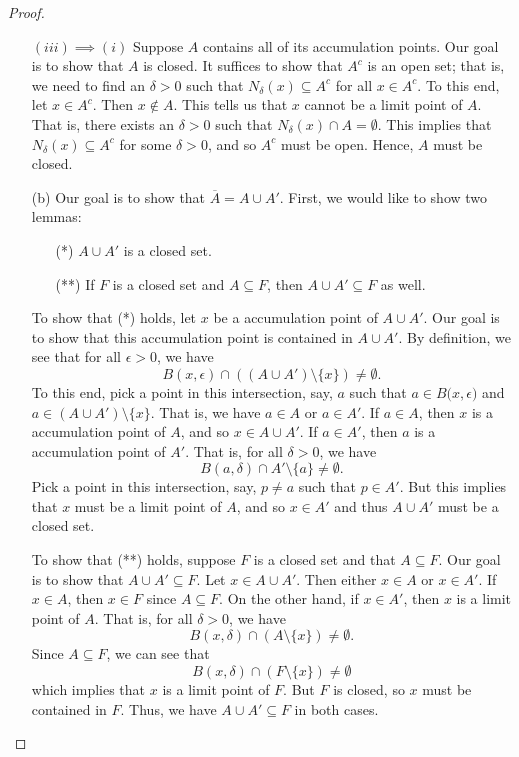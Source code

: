 \documentclass[a4paper]{article}
\begin{document}
\begin{proof}
\begin{enumerate}
        \( (iii) \implies (i) \) Suppose \( A  \) contains all of its accumulation points. Our goal is to show that \( A  \) is closed. It suffices to show that \( A^{c} \) is an open set; that is, we need to find an \( \delta > 0  \) such that \( {N}_{\delta}(x) \subseteq A^{c} \) for all \( x \in A^{c} \). To this end, let \( x \in A^{c} \). Then \( x \notin A  \). This tells us that \( x  \) cannot be a limit point of \( A  \). That is, there exists an \( \delta > 0  \) such that \( {N}_{\delta}(x) \cap A = \emptyset \). This implies that \( {N}_{\delta}(x) \subseteq A^{c} \) for some \( \delta > 0  \), and so \( A^{c} \) must be open. Hence, \( A  \) must be closed.
    \item[(b)] Our goal is to show that \( \overline{A} = A \cup A' \). First, we would like to show two lemmas:   
        \begin{enumerate}
            \item[(*)] \( A \cup A' \) is a closed set.
            \item[(**)] If \( F  \) is a closed set and \( A \subseteq F \), then \( A \cup A' \subseteq F  \) as well. 
        \end{enumerate}
        To show that (*) holds, let \( x  \) be a accumulation point of \( A \cup A' \). Our goal is to show that this accumulation point is contained in \( A \cup A' \). By definition, we see that for all \( \epsilon > 0  \), we have 
        \[  {B}(x,\epsilon) \cap ((A \cup A') \setminus  \{ x \} ) \neq \emptyset. \]
        To this end, pick a point in this intersection, say, \( a  \) such that \( a \in {B(x,\epsilon})  \) and \( a \in (A \cup A') \setminus  \{ x \}  \). That is, we have \( a \in A  \) or \( a \in A' \). If \( a \in A  \), then \( x  \) is a accumulation point of \( A  \), and so \( x \in A \cup A' \). If \( a \in A' \), then \( a  \) is a accumulation point of \( A' \). That is, for all \( \delta> 0  \), we have 
        \[ B(a,\delta) \cap A' \setminus  \{ a \} \neq \emptyset.  \]
        Pick a point in this intersection, say, \( p \neq a  \) such that \( p \in A' \). But this implies that \( x  \) must be a limit point of \( A  \), and so \( x  \in A'  \) and thus \( A \cup A' \) must be a closed set.

        To show that (**) holds, suppose \( F  \) is a closed set and that \( A \subseteq  F  \). Our goal is to show that \( A \cup A' \subseteq F  \). Let \( x \in A \cup A' \). Then either \( x \in A  \) or \( x \in A' \). If \( x \in A  \), then \( x \in F  \) since \( A \subseteq F  \). On the other hand, if \( x \in A' \), then \( x  \) is a limit point of \( A  \). That is, for all \( \delta > 0  \), we have 
        \[  B(x,\delta) \cap (A \setminus  \{ x \} ) \neq \emptyset. \]
         Since \( A \subseteq F  \), we can see that 
         \[  B(x,\delta) \cap (F \setminus  \{ x \} ) \neq \emptyset \]
         which implies that \( x  \) is a limit point of \( F  \). But \( F  \) is closed, so \( x  \) must be contained in \( F  \). Thus, we have \( A \cup A' \subseteq  F  \) in both cases.


\end{enumerate}
\end{proof}
\end{document}
